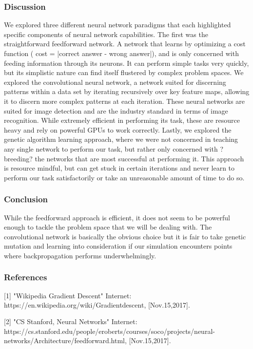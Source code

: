 \documentclass[article, onecolumn, draftclsnofoot,10pt, compsoc]{IEEEtran}
\begin{document}
\subsubsection{Discussion}
We explored three different  neural network paradigms that each highlighted specific components of neural network capabilities. The first was the straightforward feedforward network. A network that learns by optimizing a cost function ( cost = |correct answer - wrong answer|), and is only concerned with feeding information through its neurons. It can perform simple tasks very quickly, but its simplistic nature can find itself flustered by complex problem spaces. We explored the convolutional neural network, a network suited for discerning patterns within a data set by iterating recursively over key feature maps, allowing it to discern more complex patterns at each iteration. These neural networks are suited for image detection and are the industry standard in terms of image recognition. While extremely efficient in performing its task, these are resource heavy and rely on powerful GPUs to work correctly.  Lastly, we explored the genetic algorithm learning approach, where we were not concerned in teaching any single network to perform our task, but rather only concerned with ?breeding? the networks that are most successful at performing it. This approach is resource mindful, but can get stuck in certain iterations and never learn to perform our task satisfactorily or take an unreasonable amount of time to do so.

\subsubsection{Conclusion}
While the feedforward approach is efficient, it does not seem to be powerful enough to tackle the problem space that we will be dealing with. The convolutional network is basically the obvious choice but it is fair to take genetic mutation and learning into consideration if our simulation encounters points where backpropagation performs underwhelmingly. 

\subsubsection{References}
[1] "Wikipedia Gradient Descent" Internet: https://en.wikipedia.org/wiki/Gradient\textunderscore descent, [Nov.15,2017].

[2] "CS Stanford, Neural Networks" Internet: https://cs.stanford.edu/people/eroberts/courses/soco/projects/neural-networks/Architecture/feedforward.html, [Nov.15,2017].
\end{document}
